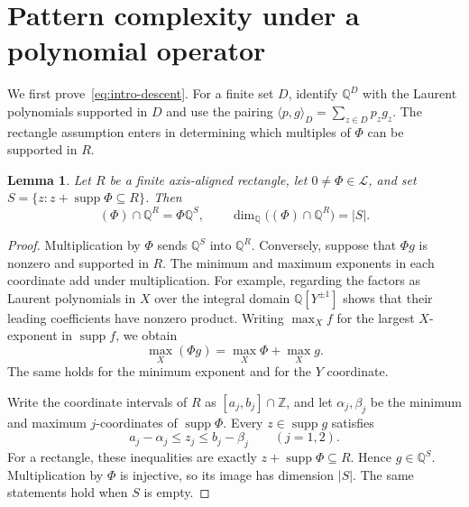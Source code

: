 \documentclass[11pt,a4paper,reqno]{amsart}
\newtheorem{lemma}[theorem]{Lemma}
\theoremstyle{remark}
\newcommand{\Z}{\mathbb Z}
\newcommand{\Q}{\mathbb Q}
\newcommand{\LL}{\mathcal L}
\DeclareMathOperator{\supp}{supp}
\numberwithin{equation}{section}
\begin{document}
\section{Pattern complexity under a polynomial operator}\label{sec:descent}
We first prove~\eqref{eq:intro-descent}. For a finite set $D$, identify $\Q^D$ with the Laurent polynomials supported in $D$ and use the pairing $\langle p,g\rangle_D=\sum_{z\in D}p_zg_z$. The rectangle assumption enters in determining which multiples of $\Phi$ can be supported in $R$.

\begin{lemma}\label{lem:supported}
Let $R$ be a finite axis-aligned rectangle, let $0\ne\Phi\in\LL$, and set
$S=\{z:z+\supp\Phi\subseteq R\}$. Then
\begin{equation}\label{eq:supported}
 (\Phi)\cap\Q^R=\Phi\Q^S,
 \qquad \dim_\Q\bigl((\Phi)\cap\Q^R\bigr)=|S|.
\end{equation}
\end{lemma}
\begin{proof}
Multiplication by $\Phi$ sends $\Q^S$ into $\Q^R$. Conversely, suppose that $\Phi g$ is nonzero and supported in $R$. The minimum and maximum exponents in each coordinate add under multiplication. For example, regarding the factors as Laurent polynomials in $X$ over the integral domain $\Q[Y^{\pm1}]$ shows that their leading coefficients have nonzero product. Writing $\max_X f$ for the largest $X$-exponent in $\supp f$, we obtain
\[
 \max_X(\Phi g)=\max_X\Phi+\max_Xg.
\]
The same holds for the minimum exponent and for the $Y$ coordinate.

Write the coordinate intervals of $R$ as $[a_j,b_j]\cap\Z$, and let $\alpha_j,\beta_j$ be the minimum and maximum $j$-coordinates of $\supp\Phi$. Every $z\in\supp g$ satisfies
\[
 a_j-\alpha_j\le z_j\le b_j-\beta_j\qquad(j=1,2).
\]
For a rectangle, these inequalities are exactly $z+\supp\Phi\subseteq R$. Hence $g\in\Q^S$. Multiplication by $\Phi$ is injective, so its image has dimension $|S|$. The same statements hold when $S$ is empty.
\end{proof}
\end{document}
